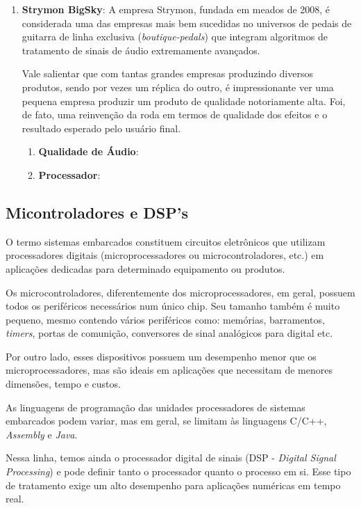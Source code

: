 \begin{enumerate}
				\item \textbf{Strymon BigSky}: A empresa Strymon, fundada em meados de 2008, é considerada uma das empresas mais bem sucedidas no universos de pedais de guitarra de linha exclusiva (\textit{boutique-pedals}) que integram algoritmos de tratamento de sinais de áudio extremamente avançados.
				
				Vale salientar que com tantas grandes empresas produzindo diversos produtos, sendo por vezes um réplica do outro, é impressionante ver uma pequena empresa produzir um produto de qualidade notoriamente alta. Foi, de fato, uma reinvenção da roda em termos de qualidade dos efeitos e o resultado esperado pelo usuário final.
				
				\begin{enumerate}
					\item \textbf{Qualidade de Áudio}:
					\item \textbf{Processador}:
				\end{enumerate}
				
				
				 
			\end{enumerate} 
		
	\subsection{Micontroladores e DSP's}

		O termo sistemas embarcados constituem circuitos eletrônicos que utilizam processadores digitais (microprocessadores ou microcontroladores, etc.) em aplicações dedicadas para determinado equipamento ou produtos.
		
		Os microcontroladores, diferentemente dos microprocessadores, em geral, possuem todos os periféricos necessários num único chip. Seu tamanho também é muito pequeno, mesmo contendo vários periféricos como: memórias, barramentos, \textit{timers}, portas de comunição, conversores de sinal analógicos para digital etc.
		
		Por outro lado, esses dispositivos possuem um desempenho menor que os microprocessadores, mas são ideais em aplicações que necessitam de menores dimensões, tempo e custos.
		
		As linguagens de programação das unidades processadores de sistemas embarcados podem variar, mas em geral, se limitam às linguagens C/C++, \textit{Assembly} e \textit{Java}.
		
		Nessa linha, temos ainda o processador digital de sinais (DSP - \textit{Digital Signal Processing}) e pode definir tanto o processador quanto o processo em si. Esse tipo de tratamento exige um alto desempenho para aplicações numéricas em tempo real.
		

